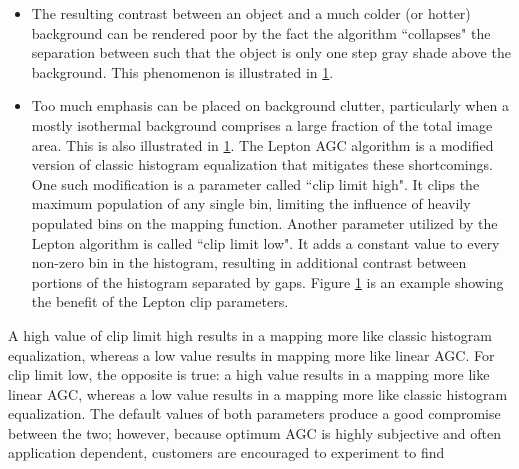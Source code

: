 \begin{itemize}
    \item The resulting contrast between an object and a much colder (or hotter)
background can be rendered poor by the fact the algorithm ``collapses" the
separation between such that the object is only one step gray shade above the
background. This phenomenon is illustrated in \ref{fig:comparisionlinearAGC}.
    \item Too much emphasis can be placed on background clutter, particularly
when a mostly isothermal background comprises a large fraction of the total
image area. This is also illustrated in \ref{fig:comparisionlinearAGC}. The
Lepton AGC algorithm is a modified version of classic histogram equalization
that mitigates these shortcomings. One such modification is a parameter called
``clip limit high". It clips the maximum population of any single bin, limiting
the influence of heavily populated bins on the mapping function. Another
parameter utilized by the Lepton algorithm is called ``clip limit low". It adds
a constant value to every non-zero bin in the histogram, resulting in additional
contrast between portions of the histogram separated by gaps. Figure
\ref{fig:comparisionlinearAGC} is an example showing the benefit of the Lepton
clip parameters.
%
\end{itemize}
\begin{figure}[htb]
    \centering
     \quad
     \quad
    \label{fig:comparisionlinearAGC}
\end{figure}
%
\newpage
A high value of clip limit high results in a mapping more like classic histogram
equalization, whereas a low value results in mapping more like linear AGC. For
clip limit low, the opposite is true: a high value results in a mapping more
like linear AGC, whereas a low value results in a mapping more like classic
histogram equalization. The default values of both parameters produce a good
compromise between the two; however, because optimum AGC is highly subjective
and often application dependent, customers are encouraged to experiment to find
